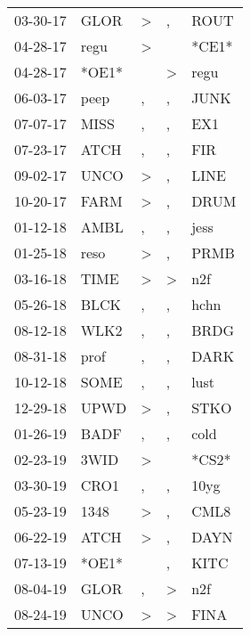 \begin{supertabular}{lllll}
 03-30-17 &   GLOR &     \textgreater &                , &   ROUT \\
 04-28-17 &   regu &     \textgreater &                  &  *CE1* \\
 04-28-17 &  *OE1* &                  &     \textgreater &   regu \\
 06-03-17 &   peep &                , &                , &   JUNK \\
 07-07-17 &   MISS &                , &                , &    EX1 \\
 07-23-17 &   ATCH &                , &                , &    FIR \\
 09-02-17 &   UNCO &     \textgreater &                , &   LINE \\
 10-20-17 &   FARM &     \textgreater &                , &   DRUM \\
 01-12-18 &   AMBL &                , &                , &   jess \\
 01-25-18 &   reso &     \textgreater &                , &   PRMB \\
 03-16-18 &   TIME &     \textgreater &     \textgreater &    n2f \\
 05-26-18 &   BLCK &                , &                , &   hchn \\
 08-12-18 &   WLK2 &                , &                , &   BRDG \\
 08-31-18 &   prof &                , &                , &   DARK \\
 10-12-18 &   SOME &                , &                , &   lust \\
 12-29-18 &   UPWD &     \textgreater &                , &   STKO \\
 01-26-19 &   BADF &                , &                , &   cold \\
 02-23-19 &   3WID &     \textgreater &                  &  *CS2* \\
 03-30-19 &   CRO1 &                , &                , &   10yg \\
 05-23-19 &   1348 &     \textgreater &                , &   CML8 \\
 06-22-19 &   ATCH &     \textgreater &                , &   DAYN \\
 07-13-19 &  *OE1* &                  &                , &   KITC \\
 08-04-19 &   GLOR &                , &     \textgreater &    n2f \\
 08-24-19 &   UNCO &     \textgreater &     \textgreater &   FINA \\

\end{supertabular}
